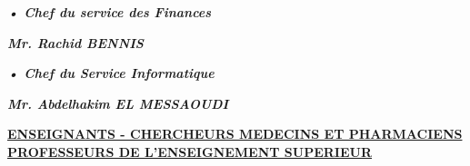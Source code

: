 \hspace*{.8em} \textbf{\emph{•	Chef du service des Finances }}

\vspace*{.8em}

\textbf{\emph{Mr. Rachid BENNIS}}

\hspace*{.8em} \textbf{\emph{•	Chef du Service Informatique }}

\vspace*{.8em}

\textbf{\emph{Mr. Abdelhakim EL MESSAOUDI}}

\pagebreak


\noindent \textbf{\underline{ENSEIGNANTS - CHERCHEURS MEDECINS ET PHARMACIENS}}\\
\textbf{\underline{PROFESSEURS DE L'ENSEIGNEMENT SUPERIEUR}}



